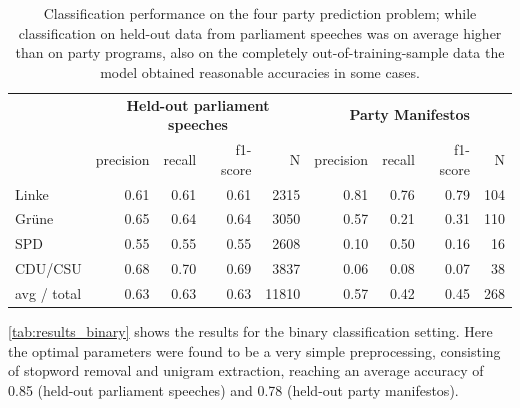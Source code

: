 \documentclass{article} %
\begin{document}
\begin{table}[t]
\begin{center}
\begin{tabular}{lrrrrrrrr}
& \multicolumn{4}{c}{\bf Held-out parliament speeches} & \multicolumn{4}{c}{\bf Party Manifestos}\\
    &         precision    &recall &  f1-score  & N    &         precision    &recall &  f1-score  & N\\
\hline \hline
      Linke     &  0.61    &  0.61  &    0.61   &   2315 &  0.81   &   0.76   &   0.79     &  104\\
     Gr\"une   &    0.65    &  0.64   &   0.64 &     3050 & 0.57  &     0.21  &    0.31    &   110\\
        SPD     &  0.55    &  0.55  &   0.55 &    2608 & 0.10  &    0.50   &   0.16    &    16\\
        CDU/CSU    &   0.68    &  0.70  &    0.69  &    3837 & 0.06   &   0.08  &    0.07   &     38 \\
\hline
avg / total    &   0.63  &    0.63  &    0.63 &    11810 & 0.57   &   0.42    &  0.45  &     268\\
%
\end{tabular}
\end{center}
\caption{
\label{tab:results_four_classes}
Classification performance on the four party prediction problem; while classification on held-out data from parliament speeches was on average higher than on party programs, also on the completely out-of-training-sample data the model obtained reasonable accuracies in some cases. 
}
\end{table}


\autoref{tab:results_binary} shows the results for the binary classification setting. Here the optimal parameters were found to be a very simple preprocessing, consisting of stopword removal and unigram extraction, reaching an average accuracy of 0.85 (held-out parliament speeches) and 0.78 (held-out party manifestos).
\end{document}
